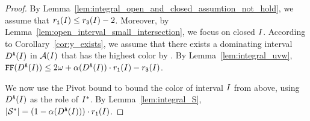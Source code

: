 \begin{proof}
    By Lemma~\ref{lem:integral_open_and_closed_assumtion_not_hold}, we assume that $r_\texttt{1}(I) \leq r_\texttt{3}(I)-2$. 
    Moreover, by Lemma~\ref{lem:open_interval_small_intersection}, we focus on closed $I$.
    According to Corollary~\ref{cor:y_exists}, we assume that there exists a dominating interval $D^\texttt{A}(I)$ in $\mathcal{A}(I)$ that has the highest color by \ff.
    By Lemma~\ref{lem:integral_uvw}, $\text{\texttt{FF}}(D^\texttt{A}(I)) \leq 2 \omega + \alpha(D^\texttt{A}(I)) \cdot r_\texttt{1}(I) - r_\texttt{3}(I)$.

    We now use the Pivot bound to bound the color of interval $I$ from above, using $D^\texttt{A}(I)$ as the role of $I^*$.
    By Lemma~\ref{lem:integral_S}, $|\mathcal{S}^*| = (1 - \alpha(D^\texttt{A}(I))) \cdot r_\texttt{1}(I)$.
\end{proof}